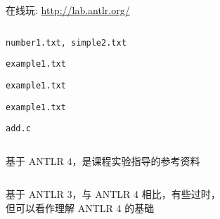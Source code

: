 \begin{frame}{}
  \begin{center}
    在线玩: \url{http://lab.antlr.org/}
  \end{center}

  \vspace{0.80cm}
  \begin{columns}
    \begin{description}[arithmetic:]
      \setlength{\itemsep}{10pt}
      \item[arithmetic:] \texttt{number1.txt, simple2.txt}
      \item[fol:] \texttt{example1.txt}
      \item[guitartab:] \texttt{example1.txt}
      \item[xyz:] \texttt{example1.txt}
      \item[C:] \texttt{add.c}
    \end{description}
  \end{columns}
\end{frame}

\begin{frame}{}
  \begin{columns}
  \end{columns}

  \vspace{0.50cm}
  \begin{center}
    基于 ANTLR 4，是课程实验指导的参考资料
  \end{center}
\end{frame}

\begin{frame}{}
  \begin{columns}
  \end{columns}

  \vspace{0.50cm}
  \begin{center}
    基于 ANTLR 3，与 ANTLR 4 相比，有些过时，\\[3pt]
    但可以看作理解 ANTLR 4 的基础
  \end{center}
\end{frame}

